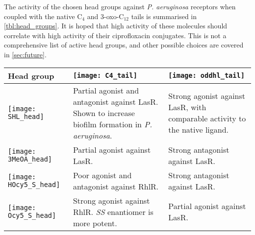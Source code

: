 The activity of the chosen head groups against \textit{P. aeruginosa} receptors when coupled with the native C$_4$ and 3-oxo-C$_{12}$ tails is summarised in \ref{tbl:head_groups}. It is hoped that high activity of these molecules should correlate with high activity of their ciprofloxacin conjugates.
This is not a comprehensive list of active head groups, and other possible choices are covered in \ref{sec:future}.

\begin{table}[H]
  \centering
\begin{tabular}{|P{0.18\textwidth}|p{0.32\textwidth}|p{0.32\textwidth}|}
\hline 
 \vspace{8px}\textbf{Head group} & \vspace{0px}\centering\texttt{[image: C4\_tail]} & \centering\arraybackslash\vspace{0px}\texttt{[image: oddhl\_tail]} \\ 
\hline 
 \vspace{0px}\texttt{[image: SHL\_head]} & Partial agonist and antagonist against LasR\cite{McInnis2011}. Shown to increase biofilm formation in \textit{P. aeruginosa}\cite{Ganguly2011}.
 & Strong agonist against LasR, with comparable activity to the native ligand\cite{Smith2003,Boursier2018,Passador1996,McInnis2011}. \\ 
\hline 
 \vspace{0px}\texttt{[image: 3MeOA\_head]} 
 & Partial agonist against LasR\cite{Hodgkinson2012a}. 
 & Strong antagonist against LasR\cite{Hodgkinson2012a}. \\ 
\hline 
 \vspace{0px}\texttt{[image: HOcy5\_S\_head]} 
 & Poor agonist and antagonist against RhlR\cite{Smith2003a,Jog2006}.
 & Strong antagonist against LasR\cite{Smith2003a}.\\ 
\hline 
 \vspace{0px}\texttt{[image: Ocy5\_S\_head]} 
 & Strong agonist against RhlR\cite{Smith2003a}. \textit{SS} enantiomer is more potent\cite{Jog2006}.
 & Partial agonist against LasR\cite{Smith2003a}. \\ 

\end{tabular}
\end{table}

